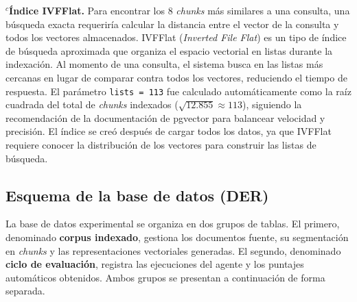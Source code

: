 \documentclass{article}
\begin{document}
\medskip
\noindent $^{c}$\textbf{Índice IVFFlat.} Para encontrar los 8 \textit{chunks} más similares a una consulta, una búsqueda exacta requeriría calcular la distancia entre el vector de la consulta y todos los vectores almacenados. IVFFlat (\textit{Inverted File Flat}) es un tipo de índice de búsqueda aproximada que organiza el espacio vectorial en listas durante la indexación. Al momento de una consulta, el sistema busca en las listas más cercanas en lugar de comparar contra todos los vectores, reduciendo el tiempo de respuesta. El parámetro \texttt{lists = 113} fue calculado automáticamente como la raíz cuadrada del total de \textit{chunks} indexados ($\sqrt{12.855} \approx 113$), siguiendo la recomendación de la documentación de pgvector para balancear velocidad y precisión. El índice se creó después de cargar todos los datos, ya que IVFFlat requiere conocer la distribución de los vectores para construir las listas de búsqueda.

\subsection*{Esquema de la base de datos (DER)}

La base de datos experimental se organiza en dos grupos de tablas. El primero, denominado \textbf{corpus indexado}, gestiona los documentos fuente, su segmentación en \textit{chunks} y las representaciones vectoriales generadas. El segundo, denominado \textbf{ciclo de evaluación}, registra las ejecuciones del agente y los puntajes automáticos obtenidos. Ambos grupos se presentan a continuación de forma separada.


\end{document}
